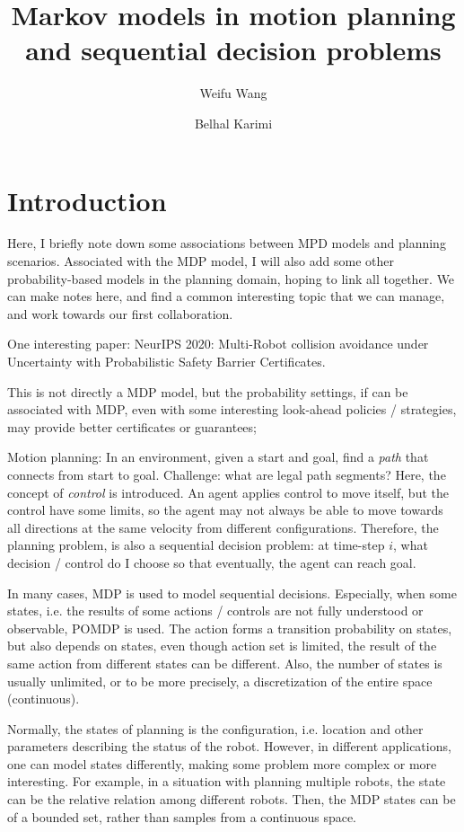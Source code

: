 \documentclass{article}
\title{Markov models in motion planning and sequential decision problems}
\author{Weifu Wang \and Belhal Karimi}
\date{}
\begin{document}
\maketitle

\section{Introduction}

Here, I briefly note down some associations between MPD models and planning scenarios. Associated with the MDP model, I will also add some other probability-based models in the planning domain, hoping to link all together. We can make notes here, and find a common interesting topic that we can manage, and work towards our first collaboration. 

One interesting paper: NeurIPS 2020: Multi-Robot collision avoidance under Uncertainty with Probabilistic Safety Barrier Certificates. 

This is not directly a MDP model, but the probability settings, if can be associated with MDP, even with some interesting look-ahead policies / strategies, may provide better certificates or guarantees; 


Motion planning: In an environment, given a start and goal, find a {\em path} that connects from start to goal. Challenge: what are legal path segments? Here, the concept of {\em control} is introduced. An agent applies control to move itself, but the control have some limits, so the agent may not always be able to move towards all directions at the same velocity from different configurations. Therefore, the planning problem, is also a sequential decision problem: at time-step $i$, what decision / control do I choose so that eventually, the agent can reach goal. 


In many cases, MDP  is used to model sequential decisions. Especially, when some states, i.e. the results of some actions / controls are not fully understood or observable, POMDP is used. The action forms a transition probability on states, but also depends on states, even though action set is limited, the result of the same action from different states can be different. Also, the number of states is usually unlimited, or to be more precisely, a discretization of the entire space (continuous). 

Normally, the states of planning is the configuration, i.e. location and other parameters describing the status of the robot. However, in different applications, one can model states differently, making some problem more complex or more interesting. For example, in a situation with planning multiple robots, the state can be the relative relation among different robots. Then, the MDP states can be of a bounded set, rather than samples from a continuous space. 
\end{document}
